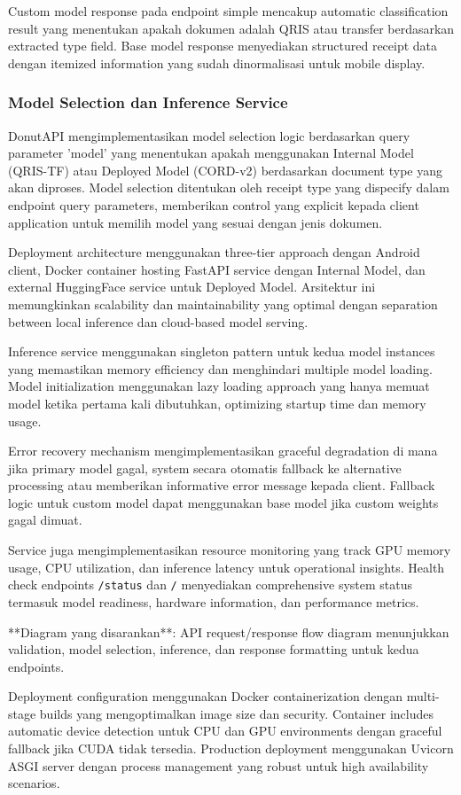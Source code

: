 Custom model response pada endpoint simple mencakup automatic classification result yang menentukan apakah dokumen adalah QRIS atau transfer berdasarkan extracted type field. Base model response menyediakan structured receipt data dengan itemized information yang sudah dinormalisasi untuk mobile display.

\subsubsection{Model Selection dan Inference Service}
\label{subsubsec:model-selection-inference}

DonutAPI mengimplementasikan model selection logic berdasarkan query parameter 'model' yang menentukan apakah menggunakan Internal Model (QRIS-TF) atau Deployed Model (CORD-v2) berdasarkan document type yang akan diproses. Model selection ditentukan oleh receipt type yang dispecify dalam endpoint query parameters, memberikan control yang explicit kepada client application untuk memilih model yang sesuai dengan jenis dokumen.

Deployment architecture menggunakan three-tier approach dengan Android client, Docker container hosting FastAPI service dengan Internal Model, dan external HuggingFace service untuk Deployed Model. Arsitektur ini memungkinkan scalability dan maintainability yang optimal dengan separation between local inference dan cloud-based model serving.

Inference service menggunakan singleton pattern untuk kedua model instances yang memastikan memory efficiency dan menghindari multiple model loading. Model initialization menggunakan lazy loading approach yang hanya memuat model ketika pertama kali dibutuhkan, optimizing startup time dan memory usage.

Error recovery mechanism mengimplementasikan graceful degradation di mana jika primary model gagal, system secara otomatis fallback ke alternative processing atau memberikan informative error message kepada client. Fallback logic untuk custom model dapat menggunakan base model jika custom weights gagal dimuat.

Service juga mengimplementasikan resource monitoring yang track GPU memory usage, CPU utilization, dan inference latency untuk operational insights. Health check endpoints \texttt{/status} dan \texttt{/} menyediakan comprehensive system status termasuk model readiness, hardware information, dan performance metrics.

**Diagram yang disarankan**: API request/response flow diagram menunjukkan validation, model selection, inference, dan response formatting untuk kedua endpoints.

Deployment configuration menggunakan Docker containerization dengan multi-stage builds yang mengoptimalkan image size dan security. Container includes automatic device detection untuk CPU dan GPU environments dengan graceful fallback jika CUDA tidak tersedia. Production deployment menggunakan Uvicorn ASGI server dengan process management yang robust untuk high availability scenarios.
